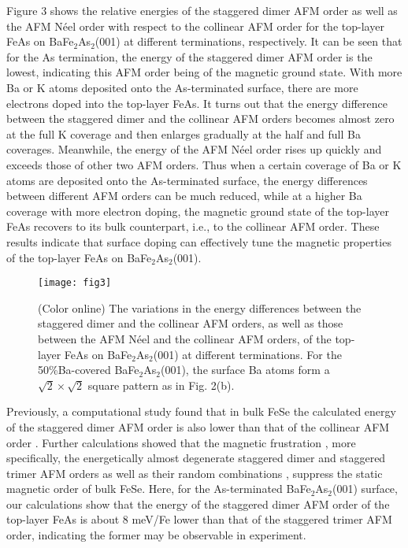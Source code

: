 \documentclass[twocolumn,aps,showpacs,prb]{revtex4-1}
\begin{document}
Figure 3 shows the relative energies of the staggered dimer AFM order as well as the AFM N\'eel order with respect to the collinear AFM order for the top-layer FeAs on BaFe$_{2}$As$_{2}$(001) at different terminations, respectively. It can be seen that for the As termination, the energy of the staggered dimer AFM order is the lowest, indicating this AFM order being of the magnetic ground state. With more Ba or K atoms deposited onto the As-terminated surface, there are more electrons doped into the top-layer FeAs. It turns out that the energy difference between the staggered dimer and the collinear AFM orders becomes almost zero at the full K coverage and then enlarges gradually at the half and full Ba coverages. Meanwhile, the energy of the AFM N\'eel order rises up quickly and exceeds those of other two AFM orders. Thus when a certain coverage of Ba or K atoms are deposited onto the As-terminated surface, the energy differences between different AFM orders can be much reduced, while at a higher Ba coverage with more electron doping, the magnetic ground state of the top-layer FeAs recovers to its bulk counterpart, i.e., to the collinear AFM order. These results indicate that surface doping can effectively tune the magnetic properties of the top-layer FeAs on BaFe$_{2}$As$_{2}$(001).

\begin{figure}[!t]
\texttt{[image: fig3]}
\caption{(Color online) The variations in the energy differences between the staggered dimer and the collinear AFM orders, as well as those between the AFM N\'eel and the collinear AFM orders, of the top-layer FeAs on BaFe$_{2}$As$_{2}$(001) at different terminations. For the 50\%Ba-covered BaFe$_{2}$As$_{2}$(001), the surface Ba atoms form a $\sqrt{2}\times\sqrt{2}$ square pattern as in Fig. 2(b).}
\label{fig3}
\end{figure}

Previously, a computational study found that in bulk FeSe the calculated energy of the staggered dimer AFM order is also lower than that of the collinear AFM order \cite{40HYCao(2015)PRB}. Further calculations showed that the magnetic frustration \cite{41JKGlasbrenner(2015)NP}, more specifically, the energetically almost degenerate staggered dimer and staggered trimer AFM orders as well as their random combinations \cite{42Kai(2016)PRB}, suppress the static magnetic order of bulk FeSe. Here, for the As-terminated BaFe$_{2}$As$_{2}$(001) surface, our calculations show that the energy of the staggered dimer AFM order of the top-layer FeAs is about 8 meV/Fe lower than that of the staggered trimer AFM order, indicating the former may be observable in experiment.
\end{document}
